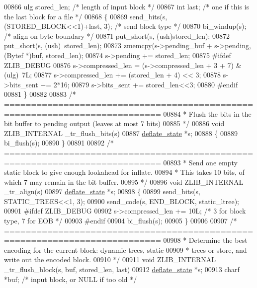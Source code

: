 \begin{DoxyCode}
{{{{{{{{{{{{{{{{{{00866     ulg stored\_len;   \textcolor{comment}{/* length of input block */}
00867     \textcolor{keywordtype}{int} last;         \textcolor{comment}{/* one if this is the last block for a file */}
00868 \{
00869     send\_bits(s, (STORED\_BLOCK<<1)+last, 3);    \textcolor{comment}{/* send block type */}
00870     bi\_windup(s);        \textcolor{comment}{/* align on byte boundary */}
00871     put\_short(s, (ush)stored\_len);
00872     put\_short(s, (ush)~stored\_len);
00873     zmemcpy(s->pending\_buf + s->pending, (Bytef *)buf, stored\_len);
00874     s->pending += stored\_len;
00875 \textcolor{preprocessor}{#ifdef ZLIB\_DEBUG}
00876     s->compressed\_len = (s->compressed\_len + 3 + 7) & (ulg)~7L;
00877     s->compressed\_len += (stored\_len + 4) << 3;
00878     s->bits\_sent += 2*16;
00879     s->bits\_sent += stored\_len<<3;
00880 \textcolor{preprocessor}{#endif}
00881 \}
00882 
00883 \textcolor{comment}{/* ===========================================================================}
00884 \textcolor{comment}{ * Flush the bits in the bit buffer to pending output (leaves at most 7 bits)}
00885 \textcolor{comment}{ */}
00886 \textcolor{keywordtype}{void} ZLIB\_INTERNAL \_tr\_flush\_bits(s)
00887     \hyperlink{structinternal__state}{deflate\_state} *s;
00888 \{
00889     bi\_flush(s);
00890 \}
00891 
00892 \textcolor{comment}{/* ===========================================================================}
00893 \textcolor{comment}{ * Send one empty static block to give enough lookahead for inflate.}
00894 \textcolor{comment}{ * This takes 10 bits, of which 7 may remain in the bit buffer.}
00895 \textcolor{comment}{ */}
00896 \textcolor{keywordtype}{void} ZLIB\_INTERNAL \_tr\_align(s)
00897     \hyperlink{structinternal__state}{deflate\_state} *s;
00898 \{
00899     send\_bits(s, STATIC\_TREES<<1, 3);
00900     send\_code(s, END\_BLOCK, static\_ltree);
00901 \textcolor{preprocessor}{#ifdef ZLIB\_DEBUG}
00902     s->compressed\_len += 10L; \textcolor{comment}{/* 3 for block type, 7 for EOB */}
00903 \textcolor{preprocessor}{#endif}
00904     bi\_flush(s);
00905 \}
00906 
00907 \textcolor{comment}{/* ===========================================================================}
00908 \textcolor{comment}{ * Determine the best encoding for the current block: dynamic trees, static}
00909 \textcolor{comment}{ * trees or store, and write out the encoded block.}
00910 \textcolor{comment}{ */}
00911 \textcolor{keywordtype}{void} ZLIB\_INTERNAL \_tr\_flush\_block(s, buf, stored\_len, last)
00912     \hyperlink{structinternal__state}{deflate\_state} *s;
00913     charf *buf;       \textcolor{comment}{/* input block, or NULL if too old */}
}}}}}}}}}}}}}}}}}}
\end{DoxyCode}
